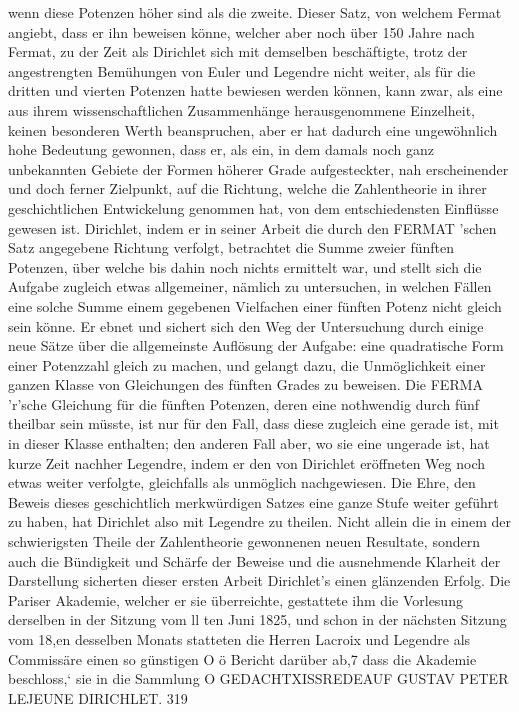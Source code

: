 \documentclass[11pt]{article}
\begin{document}
\noindent wenn diese Potenzen höher sind als die zweite. Dieser Satz, von welchem Fermat angiebt, dass er ihn beweisen könne, welcher aber noch über 150 Jahre nach Fermat, zu der Zeit als Dirichlet sich mit demselben beschäftigte, trotz der angestrengten Bemühungen von Euler und Legendre nicht weiter, als für die dritten und vierten Potenzen hatte bewiesen werden können, kann zwar, als eine aus ihrem wissenschaftlichen Zusammenhänge herausgenommene Einzelheit, keinen besonderen Werth beanspruchen, aber er hat dadurch eine ungewöhnlich hohe Bedeutung gewonnen, dass er, als ein, in dem damals noch ganz unbekannten Gebiete der Formen höherer Grade aufgesteckter, nah erscheinender und doch ferner Zielpunkt, auf die Richtung, welche die Zahlentheorie in ihrer geschichtlichen Entwickelung genommen hat, von dem entschiedensten Einflüsse gewesen ist. Dirichlet, indem er in seiner Arbeit die durch den FERMAT ’schen Satz angegebene Richtung verfolgt, betrachtet die Summe zweier fünften Potenzen, über welche bis dahin noch nichts ermittelt war, und stellt sich die Aufgabe zugleich etwas allgemeiner, nämlich zu untersuchen, in welchen Fällen eine solche Summe einem gegebenen Vielfachen einer fünften Potenz nicht gleich sein könne. Er ebnet und sichert sich den Weg der Untersuchung durch einige neue Sätze über die allgemeinste Auflösung der Aufgabe: eine quadratische Form einer Potenzzahl gleich zu machen, und gelangt dazu, die Unmöglichkeit einer ganzen Klasse von Gleichungen des fünften Grades zu beweisen. Die FERMA 'r’sche Gleichung für die fünften Potenzen, deren eine nothwendig durch fünf theilbar sein müsste, ist nur für den Fall, dass diese zugleich eine gerade ist, mit in dieser Klasse enthalten; den anderen Fall aber, wo sie eine ungerade ist, hat kurze Zeit nachher Legendre, indem er den von Dirichlet eröffneten Weg noch etwas weiter verfolgte, gleichfalls als unmöglich nachgewiesen. Die Ehre, den Beweis dieses geschichtlich merkwürdigen Satzes eine ganze Stufe weiter geführt zu haben, hat Dirichlet also mit Legendre zu theilen. Nicht allein die in einem der schwierigsten Theile der Zahlentheorie gewonnenen neuen Resultate, sondern auch die Bündigkeit und Schärfe der Beweise und die ausnehmende Klarheit der Darstellung sicherten dieser ersten Arbeit Dirichlet’s einen glänzenden Erfolg. Die Pariser Akademie, welcher er sie überreichte, gestattete ihm die Vorlesung derselben in der Sitzung vom ll ten Juni 1825, und schon in der nächsten Sitzung vom 18,en desselben Monats statteten die Herren Lacroix und Legendre als Commissäre einen so günstigen O ö Bericht darüber ab,7 dass die Akademie beschloss,‘ sie in die Sammlung O GEDACHTXISSREDEAUF GUSTAV PETER LEJEUNE DIRICHLET. 319
\par
\end{document}
